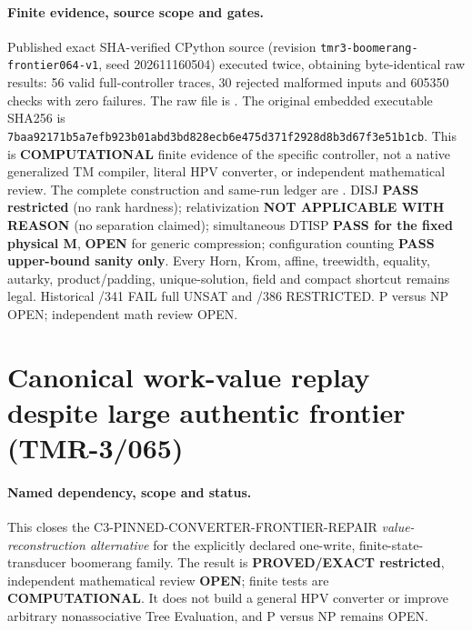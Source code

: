 \documentclass[11pt]{article}
\begin{document}
\paragraph{Finite evidence, source scope and gates.}
Published exact SHA-verified CPython source
(revision \texttt{tmr3-boomerang-frontier064-v1},
seed 202611160504) executed twice, obtaining byte-identical
raw results: 56 valid full-controller traces, 30 rejected
malformed inputs and 605350 checks with zero failures.
The raw file is
.
The original embedded executable SHA256 is
\texttt{7baa92171b5a7efb923b01abd3bd828ecb6e475d371f2928d8b3d67f3e51b1cb}.
This is \textbf{COMPUTATIONAL} finite evidence of the
specific controller, not a native generalized TM compiler,
literal HPV converter, or independent mathematical review.
The complete construction and same-run ledger are
.
DISJ \textbf{PASS restricted} (no rank hardness);
relativization \textbf{NOT APPLICABLE WITH REASON}
(no separation claimed);
simultaneous DTISP \textbf{PASS for the fixed physical M},
\textbf{OPEN} for generic compression;
configuration counting \textbf{PASS upper-bound sanity only}.
Every Horn, Krom, affine, treewidth, equality, autarky,
product/padding, unique-solution, field and compact shortcut
remains legal. Historical /341 FAIL full UNSAT and /386 RESTRICTED.
P versus NP OPEN; independent math review OPEN.

\section{Canonical work-value replay despite large authentic frontier (TMR-3/065)}
\paragraph{Named dependency, scope and status.}
This closes the \textsf{C3-PINNED-CONVERTER-FRONTIER-REPAIR}
\emph{value-reconstruction alternative} for the explicitly declared
one-write, finite-state-transducer boomerang family. The result is
\textbf{PROVED/EXACT restricted}, independent mathematical review
\textbf{OPEN}; finite tests are \textbf{COMPUTATIONAL}. It does not
build a general HPV converter or improve arbitrary nonassociative
Tree Evaluation, and P versus NP remains OPEN.
\end{document}
